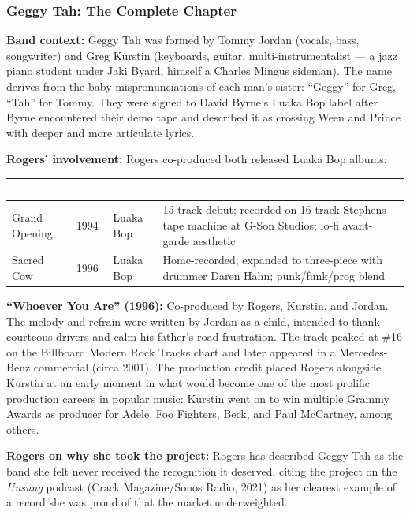 \documentclass[11pt,letterpaper]{article}
\newcommand{\tableheader}[1]{\textbf{\sffamily\textcolor{white}{#1}}}
\begin{document}
\subsubsection{Geggy Tah: The Complete Chapter}

\textbf{Band context:} Geggy Tah was formed by Tommy Jordan (vocals, bass, songwriter) and Greg Kurstin (keyboards, guitar, multi-instrumentalist --- a jazz piano student under Jaki Byard, himself a Charles Mingus sideman). The name derives from the baby mispronunciations of each man's sister: ``Geggy'' for Greg, ``Tah'' for Tommy. They were signed to David Byrne's Luaka Bop label after Byrne encountered their demo tape and described it as crossing Ween and Prince with deeper and more articulate lyrics.

\textbf{Rogers' involvement:} Rogers co-produced both released Luaka Bop albums:

\begin{center}
\begin{tabularx}{\textwidth}{L{3.5cm}C{1.8cm}L{2.5cm}X}
\toprule
{}
\tableheader{Album} & \tableheader{Year} & \tableheader{Label} & \tableheader{Notes} \\
\midrule
Grand Opening & 1994 & Luaka Bop & 15-track debut; recorded on 16-track Stephens tape machine at G-Son Studios; lo-fi avant-garde aesthetic \\
Sacred Cow & 1996 & Luaka Bop & Home-recorded; expanded to three-piece with drummer Daren Hahn; punk/funk/prog blend \\
\bottomrule
\end{tabularx}
\end{center}

\textbf{``Whoever You Are'' (1996):} Co-produced by Rogers, Kurstin, and Jordan. The melody and refrain were written by Jordan as a child, intended to thank courteous drivers and calm his father's road frustration. The track peaked at \#16 on the Billboard Modern Rock Tracks chart and later appeared in a Mercedes-Benz commercial (circa 2001). The production credit placed Rogers alongside Kurstin at an early moment in what would become one of the most prolific production careers in popular music: Kurstin went on to win multiple Grammy Awards as producer for Adele, Foo Fighters, Beck, and Paul McCartney, among others.

\textbf{Rogers on why she took the project:} Rogers has described Geggy Tah as the band she felt never received the recognition it deserved, citing the project on the \textit{Unsung} podcast (Crack Magazine/Sonos Radio, 2021) as her clearest example of a record she was proud of that the market underweighted.
\end{document}
